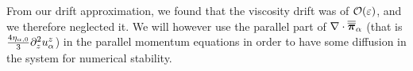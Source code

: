 %
From our drift approximation, we found that the viscosity drift was of $\mathcal{O}(\varepsilon)$, and we therefore neglected it.
We will however use the parallel part of $\nabla\cdot\boldsymbol{\overline{\overline{\pi}}}_\alpha$ (that is $\frac{4\eta_{\alpha,0}}{3} \partial_z^2 u^{z}_{\alpha}$) in the parallel momentum equations in order to have some diffusion in the system for numerical stability.
